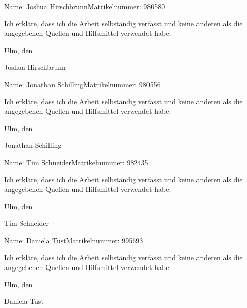 \documentclass[a4paper,
10pt,
headsepline,           %
twoside,
openright,
pointlessnumbers,      %
bibtotoc,              %
chapterprefix,
DIV=9,                
]{scrbook}
\newcommand{\fullnameA}{Joshua Hirschbrunn}
\newcommand{\fullnameB}{Jonathan Schilling}
\newcommand{\fullnameC}{Tim Schneider}
\newcommand{\fullnameD}{Daniela Tust}
\newcommand{\matnrA}{980580}%
\newcommand{\matnrB}{980556}
\newcommand{\matnrC}{982435}
\newcommand{\matnrD}{995693}
\begin{document}


\tableofcontents

\mainmatter %







\appendix


\backmatter
\printglossaries
\printbibliography

\clearpage
\thispagestyle{empty}

Name: \fullnameA \hfill Matrikelnummer: \matnrA \vspace{2cm}


Ich erkläre, dass ich die Arbeit selbständig verfasst und keine anderen als die angegebenen Quellen und Hilfsmittel verwendet habe.\vspace{2cm}

Ulm, den \dotfill

\hspace{10cm} {\footnotesize \fullnameA}

\clearpage
\thispagestyle{empty}

Name: \fullnameB \hfill Matrikelnummer: \matnrB \vspace{2cm}


Ich erkläre, dass ich die Arbeit selbständig verfasst und keine anderen als die angegebenen Quellen und Hilfsmittel verwendet habe.\vspace{2cm}

Ulm, den \dotfill

\hspace{10cm} {\footnotesize \fullnameB}

\clearpage
\thispagestyle{empty}

Name: \fullnameC \hfill Matrikelnummer: \matnrC \vspace{2cm}


Ich erkläre, dass ich die Arbeit selbständig verfasst und keine anderen als die angegebenen Quellen und Hilfsmittel verwendet habe.\vspace{2cm}

Ulm, den \dotfill

\hspace{10cm} {\footnotesize \fullnameC}

\clearpage
\thispagestyle{empty}

Name: \fullnameD \hfill Matrikelnummer: \matnrD \vspace{2cm}


Ich erkläre, dass ich die Arbeit selbständig verfasst und keine anderen als die angegebenen Quellen und Hilfsmittel verwendet habe.\vspace{2cm}

Ulm, den \dotfill

\hspace{10cm} {\footnotesize \fullnameD}
\end{document}
